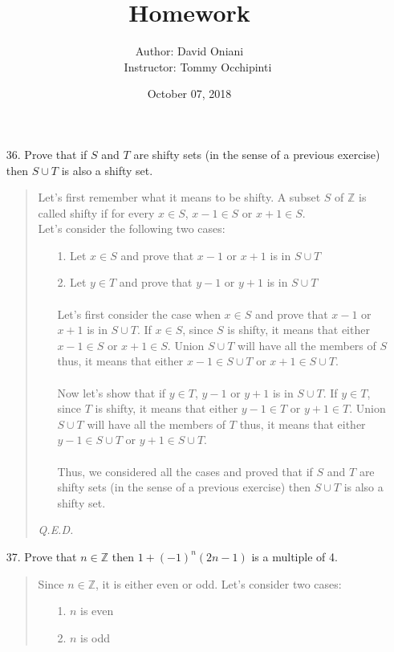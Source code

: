\documentclass[12pt, a4paper]{article}                      %
\title{\bf{Homework \textnumero 6}}
\author{Author: David Oniani
\\
\ \ \ Instructor: Tommy Occhipinti}
\date{October 07, 2018}
\newcommand{\intz}{\mathbb{Z}}
\begin{document}
\maketitle


\begin{itemize}
\item[36.]
Prove that if $S$ and $T$ are shifty sets (in the sense of a previous exercise) then $S \cup T$
is also a shifty set.
\begin{quote}
Let's first remember what it means to be shifty.
A subset $S$ of $\intz$ is called shifty if for every $x \in S$, $x - 1 \in S$ or $x + 1 \in S$.\\
Let's consider the following two cases:
\begin{itemize}
\item[1.]
Let $x \in S$ and prove that $x - 1$ or $x + 1$ is in $S \cup T$
\item[2.]
Let $y \in T$ and prove that $y - 1$ or $y + 1$ is in $S \cup T$
\\\\
Let's first consider the case when $x \in S$ and prove that $x - 1$ or $x + 1$ is in $S \cup T$.
If $x \in S$, since $S$ is shifty, it means that either $x - 1 \in S$ or $x + 1 \in S$. Union $S \cup T$
will have all the members of $S$ thus, it means that either $x - 1 \in S \cup T$ or $x + 1 \in S \cup T$.
\\\\
Now let's show that if $y \in T$, $y - 1$ or $y + 1$ is in $S \cup T$.
If $y \in T$, since $T$ is shifty, it means that either $y - 1 \in T$ or $y + 1 \in T$. Union $S \cup T$
will have all the members of $T$ thus, it means that either $y - 1 \in S \cup T$ or $y + 1 \in S \cup T$.
\\\\
Thus, we considered all the cases and proved that if $S$ and $T$ are shifty sets (in the sense of a previous exercise) then $S \cup T$
is also a shifty set.
\end{itemize}
\begin{flushright}
\textit{Q.E.D.}
\end{flushright}
\end{quote}

\item[37.]
Prove that $n \in \intz$ then $1 + (-1)^n(2n-1)$ is a multiple of 4.
\begin{quote}
Since $n \in \intz$, it is either even or odd. Let's consider two cases:
\begin{itemize}
\item[1.]
$n$ is even
\item[2.]
$n$ is odd
\end{itemize}


\end{quote}
\end{itemize}
\end{document}
